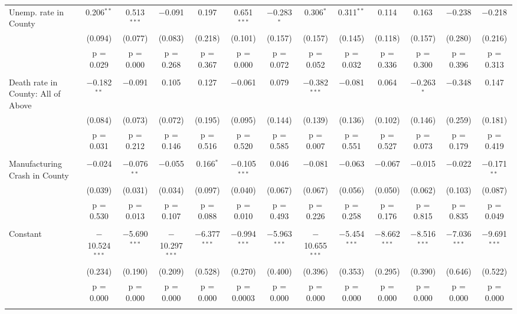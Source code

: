 \begin{longtable}{@{\extracolsep{5pt}}lcccccccccccc}
 Unemp. rate in County & 0.206$^{**}$ & 0.513$^{***}$ & $-$0.091 & 0.197 & 0.651$^{***}$ & $-$0.283$^{*}$ & 0.306$^{*}$ & 0.311$^{**}$ & 0.114 & 0.163 & $-$0.238 & $-$0.218 \\ 
  & (0.094) & (0.077) & (0.083) & (0.218) & (0.101) & (0.157) & (0.157) & (0.145) & (0.118) & (0.157) & (0.280) & (0.216) \\ 
  & p = 0.029 & p = 0.000 & p = 0.268 & p = 0.367 & p = 0.000 & p = 0.072 & p = 0.052 & p = 0.032 & p = 0.336 & p = 0.300 & p = 0.396 & p = 0.313 \\ 
  & & & & & & & & & & & & \\ 
 Death rate in County: All of Above & $-$0.182$^{**}$ & $-$0.091 & 0.105 & 0.127 & $-$0.061 & 0.079 & $-$0.382$^{***}$ & $-$0.081 & 0.064 & $-$0.263$^{*}$ & $-$0.348 & 0.147 \\ 
  & (0.084) & (0.073) & (0.072) & (0.195) & (0.095) & (0.144) & (0.139) & (0.136) & (0.102) & (0.146) & (0.259) & (0.181) \\ 
  & p = 0.031 & p = 0.212 & p = 0.146 & p = 0.516 & p = 0.520 & p = 0.585 & p = 0.007 & p = 0.551 & p = 0.527 & p = 0.073 & p = 0.179 & p = 0.419 \\ 
  & & & & & & & & & & & & \\ 
 Manufacturing Crash in County & $-$0.024 & $-$0.076$^{**}$ & $-$0.055 & 0.166$^{*}$ & $-$0.105$^{***}$ & 0.046 & $-$0.081 & $-$0.063 & $-$0.067 & $-$0.015 & $-$0.022 & $-$0.171$^{**}$ \\ 
  & (0.039) & (0.031) & (0.034) & (0.097) & (0.040) & (0.067) & (0.067) & (0.056) & (0.050) & (0.062) & (0.103) & (0.087) \\ 
  & p = 0.530 & p = 0.013 & p = 0.107 & p = 0.088 & p = 0.010 & p = 0.493 & p = 0.226 & p = 0.258 & p = 0.176 & p = 0.815 & p = 0.835 & p = 0.049 \\ 
  & & & & & & & & & & & & \\ 
 Constant & $-$10.524$^{***}$ & $-$5.690$^{***}$ & $-$10.297$^{***}$ & $-$6.377$^{***}$ & $-$0.994$^{***}$ & $-$5.963$^{***}$ & $-$10.655$^{***}$ & $-$5.454$^{***}$ & $-$8.662$^{***}$ & $-$8.516$^{***}$ & $-$7.036$^{***}$ & $-$9.691$^{***}$ \\ 
  & (0.234) & (0.190) & (0.209) & (0.528) & (0.270) & (0.400) & (0.396) & (0.353) & (0.295) & (0.390) & (0.646) & (0.522) \\ 
  & p = 0.000 & p = 0.000 & p = 0.000 & p = 0.000 & p = 0.0003 & p = 0.000 & p = 0.000 & p = 0.000 & p = 0.000 & p = 0.000 & p = 0.000 & p = 0.000 \\ 
  & & & & & & & & & & & & \\ 

\end{longtable}
